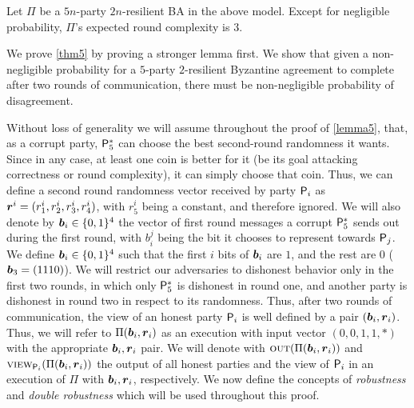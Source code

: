 \begin{theorem}\label{thm5}
	Let $\Pi$ be a $5n$-party $2n$-resilient BA in the above model. Except for negligible probability, $\Pi$'s expected round complexity is $3$.
\end{theorem}

We prove \cref{thm5} by proving a stronger lemma first. We show that given a non-negligible probability for a $5$-party $2$-resilient Byzantine agreement to complete after two rounds of communication, there must be non-negligible probability of disagreement.  

\begin{lemma}\label{lemma5}
\end{lemma}

Without loss of generality we will assume throughout the proof of \cref{lemma5}, that, as a corrupt party, $\mathsf{P}_5^\ast$ can choose the best second-round randomness it wants.  Since in any case, at least one coin is better for it (be its goal attacking correctness or round complexity), it can simply choose that coin. Thus, we can define a second round randomness vector received by party $\mathsf{P}_i$ as ${ \boldsymbol{r}}^i = (r^i_1,r^i_2,r^i_3,r^i_4)$, with $r^i_5$ being a constant, and therefore ignored.
We will also denote by ${ \boldsymbol{b}}_i \in \{0,1\}^4$ the vector of first round messages a corrupt $\mathsf{P}_5^\ast$ sends out during the first round, with $b_i^j$ being the bit it chooses to represent towards $\mathsf{P}_j$. We define ${ \boldsymbol{b}}_i \in \{0,1\}^4$ such that the first $i$ bits of ${ \boldsymbol{b}}_i$ are $1$, and the rest are $0$ (\eg ${ \boldsymbol{b}}_3 = (1110)$).
We will restrict our adversaries to dishonest behavior only in the first two rounds, in which only $\mathsf{P}_5^\ast$ is dishonest in round one, and another party is dishonest in round two in respect to its randomness. Thus, after two rounds of communication, the view of an honest party $\mathsf{P}_i$ is well defined by a pair $({ \boldsymbol{b}}_i,{ \boldsymbol{r}}_i)$.  
Thus, we will refer to $\Pi({ \boldsymbol{b}}_i,{ \boldsymbol{r}}_i)$ as an execution with input vector $(0,0,1,1,\ast)$ with the appropriate ${ \boldsymbol{b}}_i,{ \boldsymbol{r}}_i$ pair. We will denote with $\textsc{out}(\Pi({ \boldsymbol{b}}_i,{ \boldsymbol{r}}_i))$ and $\textsc{view}_{\mathsf{P}_i}(\Pi({ \boldsymbol{b}}_i,{ \boldsymbol{r}}_i))$ the output of all honest parties and the view of $\mathsf{P}_i$ in an execution of $\Pi$ with ${ \boldsymbol{b}}_i,{ \boldsymbol{r}}_i$, respectively. 
We now define the concepts of \emph{robustness} and \emph{double robustness} which will be used throughout this proof.

